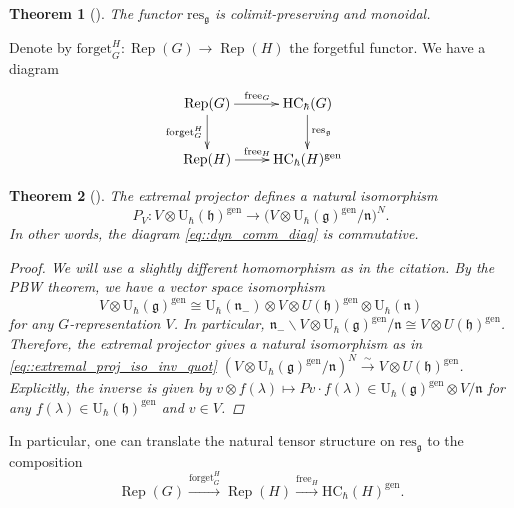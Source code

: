 \documentclass[10pt,a4paper]{article}
\numberwithin{equation}{section}
\newtheorem{Theorem}{Theorem}[section]
\newcommand{\U}{\mathrm{U}_{\hbar}}
\newcommand{\g}{\mathfrak{g}}
\newcommand{\h}{\mathfrak{h}}
\newcommand{\n}{\mathfrak{n}}
\newcommand{\forget}{\mathrm{forget}}
\newcommand{\free}{\mathrm{free}}
\newcommand{\gen}{\mathrm{gen}}
\newcommand{\HC}{\mathrm{HC}_{\hbar}}
\DeclareMathOperator{\Rep}{Rep}
\newcommand{\res}{\mathrm{res}}
\begin{document}
	\begin{Theorem}[{\cite[Corollary 4.18]{KalmykovSafronov}}]
		\label{thm::res_exact_monoidal}
		The functor $\res_{\g}$ is colimit-preserving and monoidal.
	\end{Theorem}
	
	
	
	Denote by $\forget_G^H\colon \Rep(G) \rightarrow \Rep(H)$ the forgetful functor. We have a diagram
	\begin{equation}
		\label{eq::dyn_comm_diag}
\begin{split}&
		\xymatrix{
			\Rep(G) \ar[d]_{\forget_G^H} \ar[r]^{\free_G} & \HC(G) \ar[d]^{\res_{\g}} \\
			\Rep(H) \ar[r]^{\free_H} & \HC(H)^{\gen}
		}
\end{split}
	\end{equation}
	
	\begin{Theorem}[{\cite{KhoroshkinOgievetsky,ZhelobenkoSalgebras}}]
		\label{thm::dynamical_trivialization}
		The extremal projector defines a natural isomorphism
		\[
		P_V\colon V \otimes \U(\h)^{\gen} \rightarrow \bigl(V \otimes \U(\g)^{\gen} /\n\bigr)^{N}.
		\]
		In other words, the diagram \eqref{eq::dyn_comm_diag} is commutative.
		\begin{proof}
			We will use a slightly different homomorphism as in the citation. By the PBW theorem, we have a vector space isomorphism
			\[
			V \otimes \U(\g)^{\gen} \cong \U(\n_-) \otimes V \otimes U(\h)^{\gen} \otimes \U(\n)
			\]
			for any $G$-representation $V$. In particular,
$
			\n_- \backslash V \otimes \U(\g)^{\gen} / \n \cong V \otimes U(\h)^{\gen}$.
			Therefore, the extremal projector gives a natural isomorphism as in \eqref{eq::extremal_proj_iso_inv_quot}
$
			(V \otimes \U(\g)^{\gen} / \n)^{N} \xrightarrow{\sim} V \otimes U(\h)^{\gen}$.
			Explicitly, the inverse is given by
$
			v \otimes f(\lambda) \mapsto P v \cdot f(\lambda)\in \U(\g)^{\gen} \otimes V / \n
$
			for any $f(\lambda)\in \U(\h)^{\gen}$ and $v\in V$.
		\end{proof}
	\end{Theorem}
	
	In particular, one can translate the natural tensor structure on $\res_{\g}$ to the composition
	\[
	\Rep(G) \xrightarrow{\forget_G^H} \Rep(H) \xrightarrow{\free_H} \HC(H)^{\gen}.
	\]
	
\end{document}
